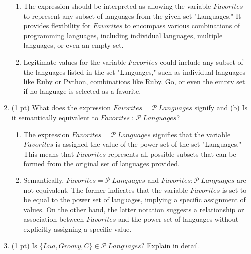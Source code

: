 \documentclass[12pt]{article}
\begin{document}
\begin{spacing}{1.5}
\begin{enumerate}
\begin{enumerate}
		      	\item The expression should be interpreted as allowing the variable $Favorites$ to represent any subset of languages from the given set "Languages." It provides flexibility for $Favorites$ to encompass various combinations of programming languages, including individual languages, multiple languages, or even an empty set. 
		      	      		      	      		      	      		      	                      
		      	\item Legitimate values for the variable $Favorites$ could include any subset of the languages listed in the set "Languages," such as individual languages like Ruby or Python, combinations like {Ruby, Go}, or even the empty set if no language is selected as a favorite.
		      \end{enumerate}
		      		      		      		      
		\item (1 pt) What does the expression $Favorites = \mathcal{P} \: Languages$ signify and (b) Is it semantically equivalent to $Favorites \: : \: \mathcal{P} \: Languages$?
		      		      		      		      
		      \begin{enumerate}
		      	\item The expression $Favorites = \mathcal{P} \: Languages$ signifies that the variable $Favorites$ is assigned the value of the power set of the set "Languages." This means that $Favorites$ represents all possible subsets that can be formed from the original set of languages provided. 
		      	      		      	      		      	      		      	                      
		      	\item Semantically, $Favorites = \mathcal{P} \: Languages$ and $Favorites : \mathcal{P} \: Languages$ are not equivalent. The former indicates that the variable $Favorites$ is set to be equal to the power set of languages, implying a specific assignment of values. On the other hand, the latter notation suggests a relationship or association between $Favorites$ and the power set of languages without explicitly assigning a specific value.\\
		      \end{enumerate}
		      		      		      		                  
		\item (1 pt) Is $\{Lua, Groovy, C\} \in \mathcal{P} \: Languages$? Explain in detail.
		      		      		      		      

\end{enumerate}
\end{spacing}
\end{document}
